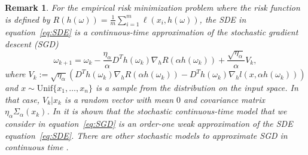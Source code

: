 \documentclass[10pt]{article} %
\def\eqref#1{equation~\ref{#1}}
\newtheorem{remark}{Remark}
\begin{document}
\begin{remark}\label{remark:Modeling}
For the empirical risk minimization problem where the risk function is defined by $R(h(\omega))=\frac{1}{m}\sum_{i=1}^m \ell(x_i,h(\omega))$, the SDE in \eqref{eq:SDE} is a continuous-time approximation of the stochastic gradient descent (SGD)
    \begin{equation}\label{eq:SGD}
        \omega_{k+1}=\omega_k-\frac{\eta_\alpha}{\alpha}D^Th(\omega_k)\nabla_h R(\alpha h(\omega_k))+\frac{\sqrt{\eta_\alpha}}{\alpha}V_k,
    \end{equation}
    where $V_k:=\sqrt{\eta_\alpha}(D^Th(\omega_k)\nabla_h R(\alpha h(\omega_k))-D^Th(\omega_k)\nabla_h l(x,\alpha h(\omega_k)))$ and $x\sim \mathrm{Unif}\{x_1,\ldots, x_n\}$ is a sample from the distribution on the input space. In that case, $V_k|x_k$ is a random vector with mean $0$ and covariance matrix $\eta_\alpha\Sigma_\alpha(x_k)$. In \citet{EeSGDtoSDE} it is shown that the stochastic continuous-time model that we consider in \eqref{eq:SGD} is an order-one weak approximation of the SDE \eqref{eq:SDE}. There are other stochastic models to approximate SGD in continuous time \citep{EeSGDtoSDE, simsekli2019tailindexanalysisstochasticgradient, gurbuzbalaban2021heavytailphenomenonsgd}.
    
\end{remark}
\end{document}
